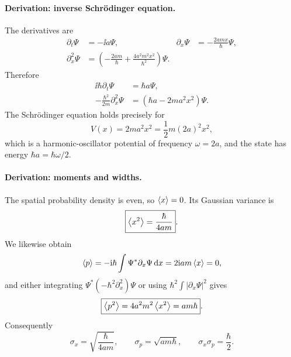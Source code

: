 \paragraph{Derivation: inverse Schrödinger equation.}
The derivatives are
\begin{align}
\partial_t\Psi&=-\ii a\Psi,&
\partial_x\Psi&=-\frac{2amx}{\hbar}\Psi,\\
\partial_x^2\Psi&=\left(-\frac{2am}{\hbar}+
\frac{4a^2m^2x^2}{\hbar^2}\right)\Psi.
\end{align}
Therefore
\begin{align}
\ii\hbar\partial_t\Psi&=\hbar a\Psi,\\
-\frac{\hbar^2}{2m}\partial_x^2\Psi
&=\left(\hbar a-2ma^2x^2\right)\Psi.
\end{align}
The Schrödinger equation holds precisely for
\begin{equation}
\boxed{V(x)=2ma^2x^2=\frac12m(2a)^2x^2,}
\end{equation}
which is a harmonic-oscillator potential of frequency $\omega=2a$, and the state has energy $\hbar a=\hbar\omega/2$.
\paragraph{Derivation: moments and widths.}
The spatial probability density is even, so $\left\langle x\right\rangle=0$. Its Gaussian variance is
\begin{equation}
\boxed{\left\langle x^2\right\rangle=\frac{\hbar}{4am}}.
\end{equation}
We likewise obtain
\begin{equation}
\left\langle p\right\rangle=-\mathrm{i}\hbar\int\Psi^*\partial_x\Psi\,\mathrm{d} x
=2\mathrm{i} am\left\langle x\right\rangle=0,
\end{equation}
and either integrating $\Psi^*(-\hbar^2\partial_x^2)\Psi$ or using
$\hbar^2\int|\partial_x\Psi|^2$ gives
\begin{equation}
\boxed{\left\langle p^2\right\rangle=4a^2m^2\left\langle x^2\right\rangle=am\hbar}.
\end{equation}
Consequently
\begin{equation}
\boxed{\sigma_x=\sqrt{\frac{\hbar}{4am}},\qquad
\sigma_p=\sqrt{am\hbar},\qquad
\sigma_x\sigma_p=\frac{\hbar}{2}.}
\end{equation}

